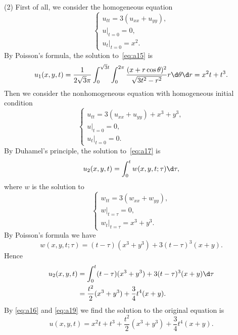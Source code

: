 \begin{solve}
  (2) First of all, we consider the homogeneous equation
  \begin{equation}\label{eq:a15}
    \begin{cases}
      u_{tt} = 3(u_{xx} + u_{yy}), \\
      u|_{t=0} = 0, \\
      u_t|_{t=0} = x^2.
    \end{cases}
  \end{equation}
  By Poisson's formula, the solution to~\eqref{eq:a15} is
  \begin{equation}\label{eq:a16}
    \begin{aligned}
      u_1(x,y,t) = \frac{1}{2\sqrt{3}\pi} \int_0^{\sqrt3 t}\int_0^{2\pi} \frac{(x+r\cos\theta)^2}{\sqrt{3t^2 - r^2}} r \d\theta\d r = x^2 t + t^3.
    \end{aligned}
  \end{equation}
  Then we consider the nonhomogeneous equation with homogeneous initial condition
  \begin{equation}\label{eq:a17}
    \begin{cases}
      u_{tt} = 3(u_{xx}+u_{yy}) + x^3 + y^3, \\
      u|_{t=0} = 0, \\
      u_t|_{t=0} = 0.
    \end{cases}
  \end{equation}
  By Duhamel's principle, the solution to~\eqref{eq:a17} is
  \begin{equation}\label{eq:18}
    u_2(x,y,t) = \int_0^t w(x,y,t;\tau) \d\tau,
  \end{equation}
  where $w$ is the solution to
  \[\begin{cases}
    w_{tt} = 3(w_{xx} + w_{yy}), \\
    w|_{t=\tau} = 0, \\
    w_t|_{t=\tau} = x^3 + y^3.
  \end{cases}\]
  By Poisson's formula we have
  \[ w(x,y,t;\tau) = (t-\tau)(x^3+y^3) + 3(t-\tau)^3(x+y). \]
  Hence
  \begin{equation}\label{eq:a19}
    \begin{aligned}
      u_2(x,y,t) 
      & = \int_0^t (t-\tau)(x^3+y^3) + 3(t-\tau)^3(x+y) \d\tau \\
      & = \frac{t^2}{2}(x^3+y^3) + \frac{3}{4}t^4 (x+y).
    \end{aligned}
  \end{equation}
  By \eqref{eq:a16} and \eqref{eq:a19} we find the solution to the original
  equation is
  \begin{equation}\label{eq:a20}
    u(x,y,t) = x^2t + t^3 + \frac{t^2}{2}(x^3+y^3) + \frac{3}{4}t^4 (x+y).
  \end{equation}
\end{solve}


